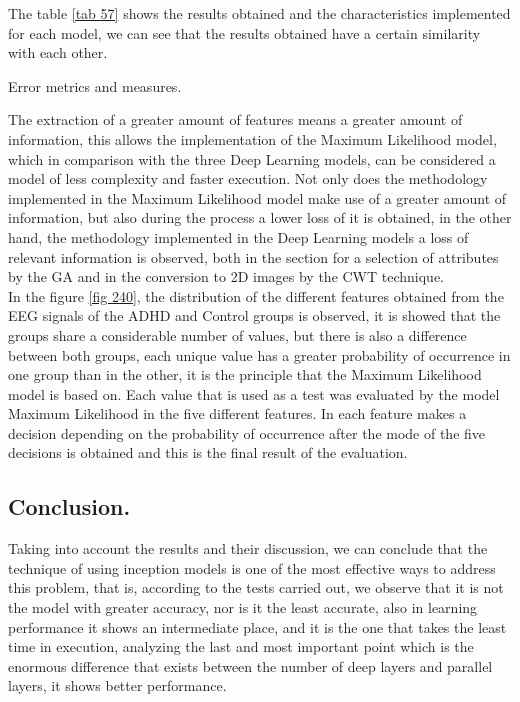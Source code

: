 \documentclass[letterpaper,12pt,openright,oneside]{article}
\begin{document}
The table \ref{tab 57} shows the results obtained and the characteristics implemented for each model, we can see that the results obtained have a certain similarity with each other.

\begin{table}[H]
\centerline{}
\caption{Error metrics and measures.}
\label{tab 57}
\end{table}
   


The extraction of a greater amount of features means a greater amount of information, this allows the implementation of the Maximum Likelihood model, which in comparison with the three Deep Learning models, can be considered a model of less complexity and faster execution. Not only does the methodology implemented in the Maximum Likelihood model make use of a greater amount of information, but also during the process a lower loss of it is obtained, in the other hand, the methodology implemented in the Deep Learning models a loss of relevant information is observed, both in the section for a selection of attributes by the GA and in the conversion to 2D images by the CWT technique.\\

In the figure \ref{fig 240}, the distribution of the different features obtained from the EEG signals of the ADHD and Control groups is observed, it is showed that the groups share a considerable number of values, but there is also a difference between both groups, each unique value has a greater probability of occurrence in one group than in the other, it is the principle that the Maximum Likelihood model is based on. Each value that is used as a test was evaluated by the model Maximum Likelihood in the five different features. In each feature makes a decision depending on the probability of occurrence after the mode of the five decisions is obtained and this is the final result of the evaluation.



\subsection{Conclusion.}

Taking into account the results and their discussion, we can conclude that the technique of using inception models is one of the most effective ways to address this problem, that is, according to the tests carried out, we observe that it is not the model with greater accuracy, nor is it the least accurate, also in learning performance it shows an intermediate place, and it is the one that takes the least time in execution, analyzing the last and most important point which is the enormous difference that exists between the number of deep layers and parallel layers, it shows better performance.\\
\end{document}
